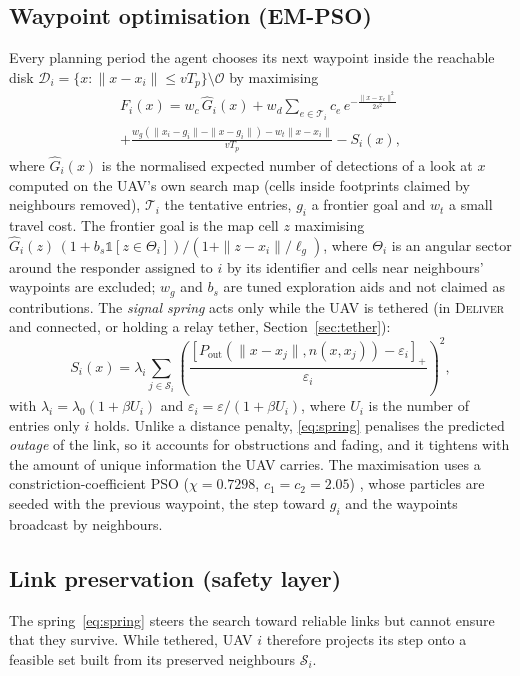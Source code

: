 \subsection{Waypoint optimisation (EM-PSO)}
Every planning period the agent chooses its next waypoint inside the reachable disk
$\mathcal{D}_i=\{x:\|x-x_i\|\le v T_p\}\setminus\mathcal{O}$ by maximising
\begin{multline}
F_i(x)=w_c\,\hat G_i(x)+w_d\!\!\sum_{e\in\mathcal{T}_i}\!c_e\,e^{-\frac{\|x-x_e\|^2}{2s^2}}\\
+\frac{w_g(\|x_i-g_i\|-\|x-g_i\|)-w_t\|x-x_i\|}{vT_p}-S_i(x),\label{eq:fitness}
\end{multline}
where $\hat G_i(x)$ is the normalised expected number of detections of a look at $x$ computed on
the UAV's own search map (cells inside footprints claimed by neighbours removed), $\mathcal{T}_i$
the tentative entries, $g_i$ a frontier goal and $w_t$ a small travel cost. The frontier goal is the
map cell $z$ maximising $\hat G_i(z)\,(1+b_s\mathbb{1}[z\in\Theta_i])/(1+\|z-x_i\|/\ell_g)$, where
$\Theta_i$ is an angular sector around the responder assigned to $i$ by its identifier and cells near
neighbours' waypoints are excluded; $w_g$ and $b_s$ are tuned exploration aids and not claimed as
contributions. The \emph{signal spring} acts only while the UAV is tethered (in
\textsc{Deliver} and connected, or holding a relay tether, Section~\ref{sec:tether}):
\begin{equation}
S_i(x)=\lambda_i\sum_{j\in\mathcal{S}_i}\left(\frac{[P_{\mathrm{out}}(\|x-x_j\|,n(x,x_j))-\varepsilon_i]_+}{\varepsilon_i}\right)^2,
\label{eq:spring}
\end{equation}
with $\lambda_i=\lambda_0(1+\beta U_i)$ and $\varepsilon_i=\varepsilon/(1+\beta U_i)$, where $U_i$ is the
number of entries only $i$ holds. Unlike a distance penalty, \eqref{eq:spring} penalises the
predicted \emph{outage} of the link, so it accounts for obstructions and fading, and it tightens
with the amount of unique information the UAV carries. The maximisation uses a
constriction-coefficient PSO ($\chi=0.7298$, $c_1=c_2=2.05$) \cite{clerc2002}, whose
particles are seeded with the previous waypoint, the step toward $g_i$ and the waypoints
broadcast by neighbours.

\subsection{Link preservation (safety layer)}\label{sec:proj}
The spring~\eqref{eq:spring} steers the search toward reliable links but cannot ensure that they
survive. While tethered, UAV $i$ therefore projects its step onto a feasible set built from its
preserved neighbours $\mathcal{S}_i$.

